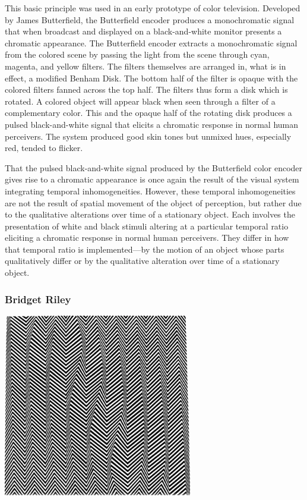 This basic principle was used in an early prototype of color television. Developed by James Butterfield, the Butterfield encoder produces a monochromatic signal that when broadcast and displayed on a black-and-white monitor presents a chromatic appearance. The Butterfield encoder extracts a monochromatic signal from the colored scene by passing the light from the scene through cyan, magenta, and yellow filters. The filters themselves are arranged in, what is in effect, a modified Benham Disk. The bottom half of the filter is opaque with the colored filters fanned across the top half. The filters thus form a disk which is rotated. A colored object will appear black when seen through a filter of a complementary color. This and the opaque half of the rotating disk produces a pulsed black-and-white signal that elicits a chromatic response in normal human perceivers. The system produced good skin tones but unmixed hues, especially red, tended to flicker.

That the pulsed black-and-white signal produced by the Butterfield color encoder gives rise to a chromatic appearance is once again the result of the visual system integrating temporal inhomogeneities. However, these temporal inhomogeneities are not the result of spatial movement of the object of perception, but rather due to the qualitative alterations over time of a stationary object. Each involves the presentation of white and black stimuli altering at a particular temporal ratio eliciting a chromatic response in normal human perceivers. They differ in how that temporal ratio is implemented---by the motion of an object whose parts qualitatively differ or by the qualitative alteration over time of a stationary object. \change

\begin{frame}[t]\frametitle{Bridget Riley}
	\begin{center}
		\includegraphics[height=8cm]{../../graphics/descending.jpg}
	\end{center}
\end{frame}

